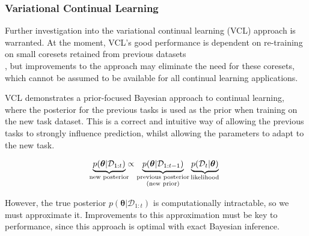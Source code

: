 \documentclass[a4paper,10pt]{article}
\let\boldtheta\theta %
\renewcommand{\theta}{\boldsymbol{\boldtheta}} %
\begin{document}
\vspace{-1.25em}
\subsubsection*{Variational Continual Learning}

\vspace{-1em}
Further investigation into the variational continual learning (VCL) approach \cite{vcl} is warranted. At the moment, VCL's good performance is dependent on re-training on small coresets retained from previous datasets \\\cite{robust}, but improvements to the approach may eliminate the need for these coresets, which cannot be assumed to be available for all continual learning applications. %

VCL demonstrates a prior-focused Bayesian approach to continual learning, where the posterior for the previous tasks is used as the prior when training on the new task dataset. This is a correct and intuitive way of allowing the previous tasks to strongly influence prediction, whilst allowing the parameters to adapt to the new task.%

\vspace{-1.95em}
\begin{equation}\label{eq:1}
\begin{split}
\underbrace{p(\theta | \mathcal{D}_{1:t})}_{\mathclap{\text{new posterior}}} \propto \underbrace{p(\theta | \mathcal{D}_{1:t-1})}_{\substack{\text{previous posterior}\\ (\text{new prior})}} \underbrace{p(\mathcal{D}_t | \theta)}_{\text{likelihood}}
\end{split}
\end{equation}

\vspace{-0.95em}
However, the true posterior $p(\theta | \mathcal{D}_{1:t})$ is computationally intractable, so we must approximate it. Improvements to this approximation must be key to performance, since this approach is optimal with exact Bayesian inference. %
\end{document}

